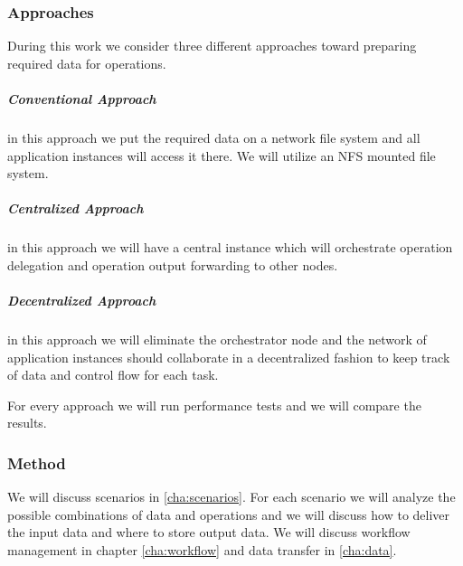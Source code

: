 
\subsubsection{Approaches}
During this work we consider three different approaches toward preparing required data for operations.
\subparagraph{Conventional Approach} in this approach we put the required data on a network file system and all
application instances will access it there. We will utilize an NFS mounted file system.
\subparagraph{Centralized Approach} in this approach we will have a central instance which will orchestrate operation
delegation and operation output forwarding to other nodes.
\subparagraph{Decentralized Approach} in this approach we will eliminate the orchestrator node and the network of
application instances should collaborate in a decentralized fashion to keep track of data and control flow for each
task.

For every approach we will run performance tests and we will compare the results.

\subsubsection{Method}
We will discuss scenarios in \ref{cha:scenarios}. For each scenario we will analyze the possible combinations 
of data and operations and we will discuss how to 
deliver the input data and where to store output data. We will discuss workflow management in chapter 
\ref{cha:workflow} and data transfer in \ref{cha:data}.


